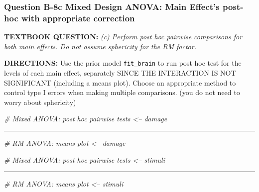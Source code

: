 \documentclass[
]{article}
\newenvironment{Shaded}{\begin{snugshade}}{\end{snugshade}}
\newcommand{\CommentTok}[1]{\textcolor[rgb]{0.56,0.35,0.01}{\textit{#1}}}
\begin{document}
\clearpage

\hypertarget{question-b-8c-mixed-design-anova-main-effects-post-hoc-with-appropriate-correction}{%
\subsubsection{Question B-8c Mixed Design ANOVA: Main Effect's post-hoc
with appropriate
correction}\label{question-b-8c-mixed-design-anova-main-effects-post-hoc-with-appropriate-correction}}

\textbf{TEXTBOOK QUESTION:} \emph{(c) Perform post hoc pairwise
comparisons for both main effects. Do not assume sphericity for the RM
factor.}

\textbf{DIRECTIONS:} Use the prior model \texttt{fit\_brain} to run post
hoc test for the levels of each main effect, separately SINCE THE
INTERACTION IS NOT SIGNIFICANT (including a means plot). Choose an
appropriate method to control type I errors when making multiple
comparisons. (you do not need to worry about sphericity)

\begin{Shaded}
\begin{Highlighting}[]
\CommentTok{# Mixed ANOVA: post hoc pairwise tests <-- damage}
\end{Highlighting}
\end{Shaded}

\begin{center}\rule{0.5\linewidth}{\linethickness}\end{center}

\begin{Shaded}
\begin{Highlighting}[]
\CommentTok{# RM ANOVA: means plot <-- damage}
\end{Highlighting}
\end{Shaded}

\clearpage

\begin{Shaded}
\begin{Highlighting}[]
\CommentTok{# Mixed ANOVA: post hoc pairwise tests <-- stimuli}
\end{Highlighting}
\end{Shaded}

\begin{center}\rule{0.5\linewidth}{\linethickness}\end{center}

\begin{Shaded}
\begin{Highlighting}[]
\CommentTok{# RM ANOVA: means plot <-- stimuli}
\end{Highlighting}
\end{Shaded}
\end{document}
